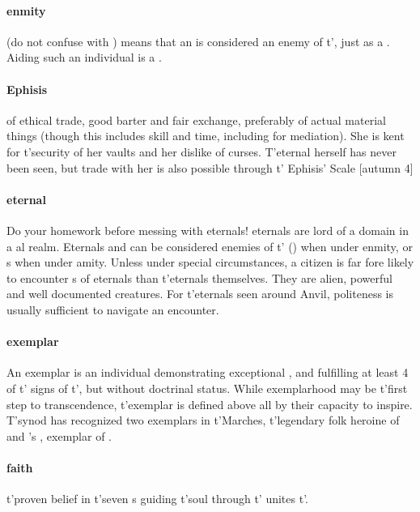 \paragraph{enmity} (do not confuse with ) means that an  is considered an enemy of t'\allowbreak {}, just as a . Aiding such an individual is a .
\paragraph{Ephisis}   of ethical trade, good barter and fair exchange, preferably of actual material things (though this includes skill and time, including for mediation). She is kent for t'\allowbreak security of her vaults and her dislike of curses. T'eternal herself has never been seen, but trade with her is also possible through t'\allowbreak {} Ephisis' Scale [autumn  4]
\paragraph{eternal} Do your homework before messing with eternals! eternals are lord of a domain in a al realm. Eternals and can be considered enemies of t'\allowbreak {} () when under enmity, or s when under amity. Unless under special circumstances, a citizen is far fore likely to encounter s of eternals than t'\allowbreak eternals themselves.  They are alien, powerful and well documented creatures. For t'\allowbreak eternals seen around Anvil, politeness is usually sufficient to navigate an encounter.
\paragraph{exemplar} An exemplar is an individual demonstrating exceptional , and fulfilling at least 4 of t' signs of t'\allowbreak {}, but without doctrinal status. While exemplarhood may be t'\allowbreak first step to transcendence, t'\allowbreak exemplar is defined above all by their capacity to inspire. T'synod has recognized two exemplars in t'\allowbreak Marches, t'\allowbreak legendary folk heroine  of  and 's , exemplar of .
\paragraph{faith} t'\allowbreak proven belief in t'\allowbreak seven s guiding t'\allowbreak soul through t'\allowbreak {} unites t'\allowbreak {}.

